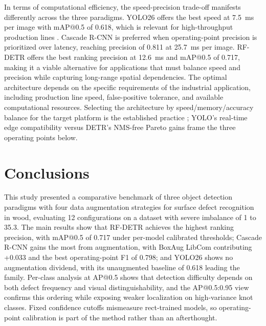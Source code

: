\documentclass[pdflatex,sn-basic,Numbered,iicol]{sn-jnl}
\begin{document}
In terms of computational efficiency, the speed-precision trade-off manifests differently across the three paradigms. YOLO26 offers the best speed at 7.5~ms per image with mAP@0.5 of 0.618, which is relevant for high-throughput production lines \citep{Kodytek2022Dataset}. Cascade R-CNN is preferred when operating-point precision is prioritized over latency, reaching precision of 0.811 at 25.7~ms per image. RF-DETR offers the best ranking precision at 12.6~ms and mAP@0.5 of 0.717, making it a viable alternative for applications that must balance speed and precision while capturing long-range spatial dependencies. The optimal architecture depends on the specific requirements of the industrial application, including production line speed, false-positive tolerance, and available computational resources. Selecting the architecture by speed/memory/accuracy balance for the target platform is the established practice \citep{huang2017speedaccuracy}; YOLO's real-time edge compatibility \citep{hussain2023yolo} versus DETR's NMS-free Pareto gains \citep{zhao2023detrs} frame the three operating points below.


\section{Conclusions}
\label{sec:conclusions}

This study presented a comparative benchmark of three object detection paradigms with four data augmentation strategies for surface defect recognition in wood, evaluating 12 configurations on a dataset with severe imbalance of 1 to 35.3. The main results show that RF-DETR achieves the highest ranking precision, with mAP@0.5 of 0.717 under per-model calibrated thresholds; Cascade R-CNN gains the most from augmentation, with BoxAug LibCom contributing +0.033 and the best operating-point F1 of 0.798; and YOLO26 shows no augmentation dividend, with its unaugmented baseline of 0.618 leading the family. Per-class analysis at AP@0.5 shows that detection difficulty depends on both defect frequency and visual distinguishability, and the AP@0.5:0.95 view confirms this ordering while exposing weaker localization on high-variance knot classes. Fixed confidence cutoffs mismeasure rect-trained models, so operating-point calibration is part of the method rather than an afterthought.
\end{document}
